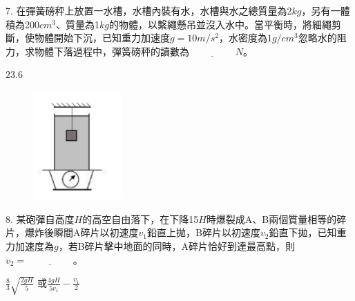 \documentclass[cn,10pt,math=newtx]{elegantbook}
\begin{document}
\begin{example}
   7. 在彈簧磅秤上放置一水槽，水槽內裝有水，水槽與水之總質量為2$kg$，另有一體積為200$cm^3$、質量為1$kg$的物體，以繫繩懸吊並沒入水中。當平衡時，將細繩剪斷，使物體開始下沉，已知重力加速度$g=10m/s^2$，水密度為$1g/cm^3$忽略水的阻力，求物體下落過程中，彈簧磅秤的讀數為$\underline{\hspace{2cm}} N$。\\
    \rightline{[桃園高中教甄109]}
\end{example}
\begin{solution}
    $23.6$
\end{solution}
\begin{figure}[htbp]
    \flushright
    \includegraphics[width=0.3\textwidth]{image/109桃園7.png}
  \end{figure}
\newpage

\begin{example}
   8. 某砲彈自高度$H$的高空自由落下，在下降15$H$時爆裂成A、B兩個質量相等的碎片，爆炸後瞬間A碎片以初速度$v_1$鉛直上拋，B碎片以初速度$v_2$鉛直下拋，已知重力加速度為$g$，若B碎片擊中地面的同時，A碎片恰好到達最高點，則$v_2=\underline{\hspace{2cm}}$。\\
    \rightline{[桃園高中教甄109]}
\end{example}
\begin{solution}
    $\frac{8}{3} \sqrt{\frac{2gH}{5}}$ 或$\frac{4gH}{5v_1}-\frac{v_1}{2}$
\end{solution}

\newpage
\end{document}
